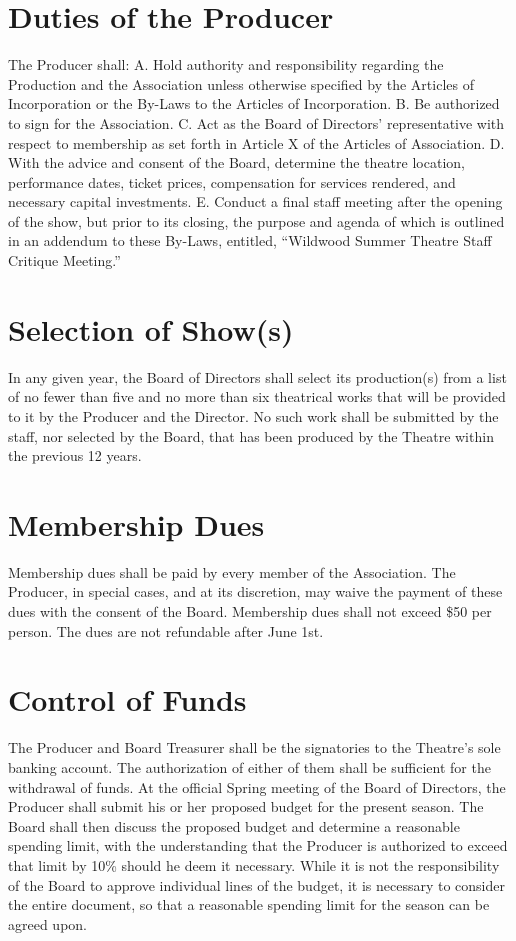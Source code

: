\documentclass{article}
\begin{document}
\section{Duties of the Producer}
The Producer shall:
A.	Hold authority and responsibility regarding the Production and the Association unless otherwise specified by the Articles of Incorporation or the By-Laws to the Articles of Incorporation.
B.     Be authorized to sign for the Association.
C.	Act as the Board of Directors' representative with respect to membership as set forth in Article X of the Articles of Association.
D.	With the advice and consent of the Board, determine the theatre location, performance dates, ticket prices, compensation for services rendered, and necessary capital investments.
E.	Conduct a final staff meeting after the opening of the show, but prior to its closing, the purpose and agenda of which is outlined in an addendum to these By-Laws, entitled, “Wildwood Summer Theatre Staff Critique Meeting.”

\section{Selection of Show(s)}
In any given year, the Board of Directors shall select its production(s) from a list of no fewer than five and no more than six theatrical works that will be provided to it by the Producer and the Director.  No such work shall be submitted by the staff, nor selected by the Board, that has been produced by the Theatre within the previous 12 years.

\section{Membership Dues}
Membership dues shall be paid by every member of the Association.  The Producer, in special cases, and at its discretion, may waive the payment of these dues with the consent of the Board.  Membership dues shall not exceed \$50 per person. The dues are not refundable after June 1st.

\section{Control of Funds}
\1 The Producer and Board Treasurer shall be the signatories to the Theatre's sole banking account.  The authorization of either of them shall be sufficient for the withdrawal of funds.
\1 At the official Spring meeting of the Board of Directors, the Producer shall submit his or her proposed budget for the present season.  The Board shall then discuss the proposed budget and determine a reasonable spending limit, with the understanding that the Producer is authorized to exceed that limit by 10\% should he deem it necessary.   While it is not the responsibility of the Board to approve individual lines of the budget, it is necessary to consider the entire document, so that a reasonable spending limit for the season can be agreed upon.
\end{document}
